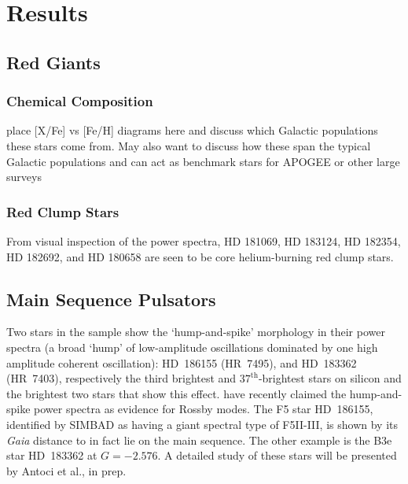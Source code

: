 \documentclass[a4paper,fleqn,usenatbib]{mnras}
\newcommand{\gaia}{\emph{Gaia}\xspace}
\begin{document}






\section{Results}
\label{targets}

\subsection{Red Giants}
\label{rgs}

\subsubsection{Chemical Composition}
\label{chemical}
place [X/Fe] vs [Fe/H] diagrams here and discuss which Galactic populations these stars come from. May also want to discuss how these span the typical Galactic populations and can act as benchmark stars for APOGEE or other large surveys 

\subsubsection{Red Clump Stars}
\label{clumpstars}

From visual inspection of the power spectra, HD 181069, HD 183124, HD 182354, HD 182692, and HD 180658 are seen to be core helium-burning red clump stars.

\subsection{Main Sequence Pulsators}
\label{pulsators}

Two stars in the sample show the `hump-and-spike' morphology in their power spectra (a broad `hump' of low-amplitude oscillations dominated by one high amplitude coherent oscillation): HD~186155 (HR~7495), and HD~183362 (HR~7403), respectively the third brightest and $37^{\text{th}}$-brightest stars on silicon and the brightest two stars that show this effect. \citet{2018MNRAS.474.2774S} have recently claimed the hump-and-spike power spectra as evidence for Rossby modes. The F5 star HD~186155, identified by SIMBAD as having a giant spectral type of F5II-III, is shown by its \gaia distance to in fact lie on the main sequence. The other example is the B3e star HD~183362 at $G = -2.576$. A detailed study of these stars will be presented by Antoci et al., in prep.
\end{document}
